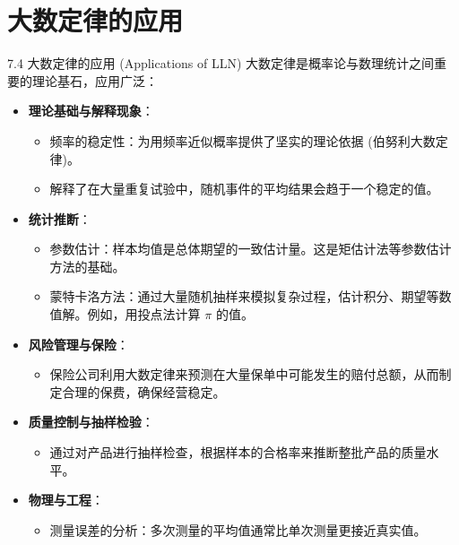 \documentclass[UTF8]{beamer} %
\begin{document}
\section{大数定律的应用}
\begin{frame}[shrink=5]{7.4 大数定律的应用 (Applications of LLN)}
    大数定律是概率论与数理统计之间重要的理论基石，应用广泛：
    \begin{itemize}
        \item \textbf{理论基础与解释现象}：
            \begin{itemize}
                \item \alert{频率的稳定性}：为用频率近似概率提供了坚实的理论依据 (伯努利大数定律)。
                \item 解释了在大量重复试验中，随机事件的平均结果会趋于一个稳定的值。
            \end{itemize}
        \item \textbf{统计推断}：
            \begin{itemize}
                \item \alert{参数估计}：样本均值是总体期望的\alert{一致估计量}。这是矩估计法等参数估计方法的基础。
                \item \alert{蒙特卡洛方法}：通过大量随机抽样来模拟复杂过程，估计积分、期望等数值解。例如，用投点法计算 $\pi$ 的值。
            \end{itemize}
        \item \textbf{风险管理与保险}：
            \begin{itemize}
                \item 保险公司利用大数定律来预测在大量保单中可能发生的赔付总额，从而制定合理的保费，确保经营稳定。
            \end{itemize}
        \item \textbf{质量控制与抽样检验}：
            \begin{itemize}
                \item 通过对产品进行抽样检查，根据样本的合格率来推断整批产品的质量水平。
            \end{itemize}
        \item \textbf{物理与工程}：
            \begin{itemize}
                \item 测量误差的分析：多次测量的平均值通常比单次测量更接近真实值。
            \end{itemize}
    \end{itemize}
\end{frame}
\end{document}
